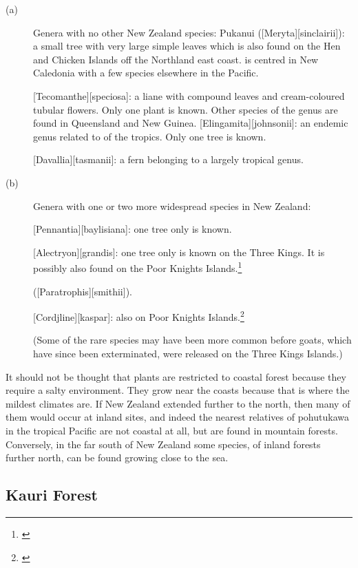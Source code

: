 \begin{description}
\item[{(a)}]Genera with no other New Zealand species: Pukanui ([Meryta][sinclairii]): a small tree with very large simple leaves which is also found on the Hen and Chicken Islands off the Northland east coast.  is centred in New Caledonia with a few species elsewhere in the Pacific.

[Tecomanthe][speciosa]: a liane with compound leaves and cream-coloured tubular flowers.
Only one plant is known.
Other species of the genus are found in Queensland and New Guinea. [Elingamita][johnsonii]: an endemic genus related to  of the tropics.
Only one tree is known.

[Davallia][tasmanii]: a fern belonging to a largely tropical genus.
\item[{(b)}]Genera with one or two more widespread species in New Zealand:

[Pennantia][baylisiana]: one tree only is known.

[Alectryon][grandis]: one tree only is known on the Three Kings.
It is possibly also found on the Poor Knights Islands.\footnote{\cite{wright1983conservation}}

 ([Paratrophis][smithii]).

[Cordjline][kaspar]: also on Poor Knights Islands.\footnote{\cite{wright1983conservation}}

(Some of the rare species may have been more common before goats, which have since been exterminated, were released on the Three Kings Islands.)
\end{description}

It should not be thought that plants are restricted to coastal forest because they require a salty environment.
They grow near the coasts because that is where the mildest climates are.
If New Zealand extended further to the north, then many of them would occur at inland sites, and indeed the nearest relatives of pohutukawa in the tropical Pacific are not coastal at all, but are found in mountain forests.
Conversely, in the far south of New Zealand some species, of inland forests further north, can be found growing close to the sea.

\subsection{Kauri Forest}

